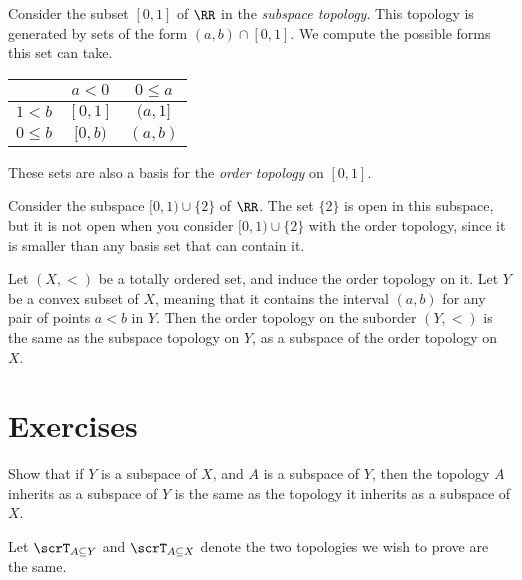 \documentclass{article}
\begin{document}
\begin{example}
    Consider the subset $[0,1]$ of $\RR$ in the \textit{subspace topology}.
    This topology is generated by sets of the form $(a,b) \cap [0,1]$.
    We compute the possible forms this set can take.
    \begin{center}
        \begin{tabular}{ c | c c }
            & $a < 0$ & $0 \leq a$ \\ 
            \hline
            $1 < b$ & $[0,1]$ & $(a,1]$ \\
            $0 \leq b$ & $[0,b)$ & $(a,b)$
        \end{tabular}
    \end{center}
    These sets are also a basis for the \textit{order topology} on $[0,1]$.
\end{example}

\begin{example} 
    Consider the subspace $[0,1) \cup \{2\}$ of $\RR$.
    The set $\{2\}$ is open in this subspace, but it is not open when you consider $[0,1) \cup \{2\}$ with the order topology, since it is smaller than any basis set that can contain it.
\end{example}

\begin{theorem}
    Let $(X, <)$ be a totally ordered set, and induce the order topology on it.
    Let $Y$ be a convex subset of $X$, meaning that it contains the interval $(a,b)$ for any pair of points $a<b$ in $Y$.
    Then the order topology on the suborder $(Y, <)$ is the same as the subspace topology on $Y$, as a subspace of the order topology on $X$.
\end{theorem}

\section*{Exercises}

\begin{exercise}
    Show that if $Y$ is a subspace of $X$, and $A$ is a subspace of $Y$, then the topology $A$ inherits as a subspace of $Y$ is the same as the topology it inherits as a subspace of $X$.
\end{exercise}

Let $\scrT_{A\subseteq Y}$ and $\scrT_{A \subseteq X}$ denote the two topologies we wish to prove are the same.
\end{document}

